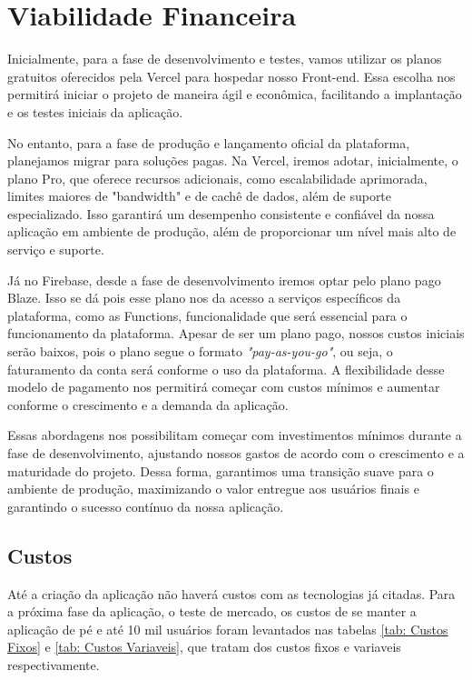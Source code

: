 \section{Viabilidade Financeira}

Inicialmente, para a fase de desenvolvimento e testes, vamos utilizar os planos gratuitos oferecidos pela Vercel para hospedar nosso Front-end. Essa escolha nos permitirá iniciar o projeto de maneira ágil e econômica, facilitando a implantação e os testes iniciais da aplicação.

No entanto, para a fase de produção e lançamento oficial da plataforma, planejamos migrar para soluções pagas. Na Vercel, iremos adotar, inicialmente, o plano Pro, que oferece recursos adicionais, como escalabilidade aprimorada, limites maiores de "bandwidth" e de cachê de dados, além de suporte especializado. Isso garantirá um desempenho consistente e confiável da nossa aplicação em ambiente de produção, além de proporcionar um nível mais alto de serviço e suporte.

Já no Firebase, desde a fase de desenvolvimento iremos optar pelo plano pago Blaze. Isso se dá pois esse plano nos da acesso a serviços específicos da plataforma, como as Functions, funcionalidade que será essencial para o funcionamento da plataforma. Apesar de ser um plano pago, nossos custos iniciais serão baixos, pois o plano segue o formato \textit{"pay-as-you-go"}, ou seja, o faturamento da conta será conforme o uso da plataforma. A flexibilidade desse modelo de pagamento nos permitirá começar com custos mínimos e aumentar conforme o crescimento e a demanda da aplicação.


Essas abordagens nos possibilitam começar com investimentos mínimos durante a fase de desenvolvimento, ajustando nossos gastos de acordo com o crescimento e a maturidade do projeto. Dessa forma, garantimos uma transição suave para o ambiente de produção, maximizando o valor entregue aos usuários finais e garantindo o sucesso contínuo da nossa aplicação.

\subsection{Custos}

Até a criação da aplicação não haverá custos com as tecnologias já citadas. Para a próxima fase da aplicação, o teste de mercado, os custos de se manter a aplicação de pé e até 10 mil usuários foram levantados nas tabelas \ref{tab: Custos Fixos} e \ref{tab: Custos Variaveis}, que tratam dos custos fixos e variaveis respectivamente.

